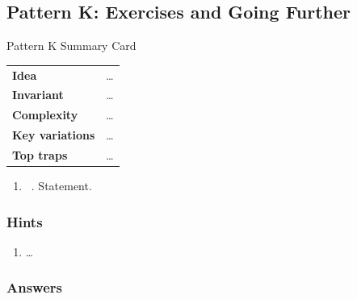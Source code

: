\subsection{Pattern K: Exercises and Going Further}
\label{ssec:chN-pK-ex}

\begin{patternbox}{Pattern K Summary Card}
\begin{tabularx}{\linewidth}{@{}>{\bfseries}l X@{}}
Idea & \ldots \\
Invariant & \ldots \\
Complexity & \ldots \\
Key variations & \ldots \\
Top traps & \ldots \\
\end{tabularx}
\end{patternbox}

\exlegend
\begin{enumerate}[leftmargin=*, label=\textbf{EK.\arabic*}, itemsep=6pt]
    \item \exeasy\ . Statement.  %
\end{enumerate}

\subsubsection*{Hints}
\begin{enumerate}[leftmargin=*, label=\textbf{EK.\arabic*}]
    \item \ldots
\end{enumerate}

\subsubsection*{Answers}
\begin{solutionbox}[EK.1]
\end{solutionbox}

